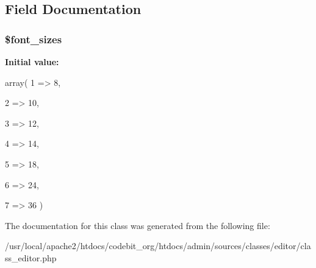 \subsection{Field Documentation}
\hypertarget{classclass__editor_a845a42b93daaa865d0645e04b840ab2d}{
\subsubsection[{\$font\-\_\-sizes}]{\setlength{\rightskip}{0pt plus 5cm}\$font\-\_\-sizes\hspace{0.3cm}{\ttfamily [protected]}}}\label{classclass__editor_a845a42b93daaa865d0645e04b840ab2d}
{\bfseries Initial value\-:}
\begin{DoxyCode}
 array( 1 => 8,
                                                                                
       2 => 10,
                                                                                
       3 => 12,
                                                                                
       4 => 14,
                                                                                
       5 => 18,
                                                                                
       6 => 24,
                                                                                
       7 => 36 )
\end{DoxyCode}


The documentation for this class was generated from the following file\-:\begin{DoxyCompactItemize}
\item 
/usr/local/apache2/htdocs/codebit\-\_\-org/htdocs/admin/sources/classes/editor/class\-\_\-editor.\-php\end{DoxyCompactItemize}
